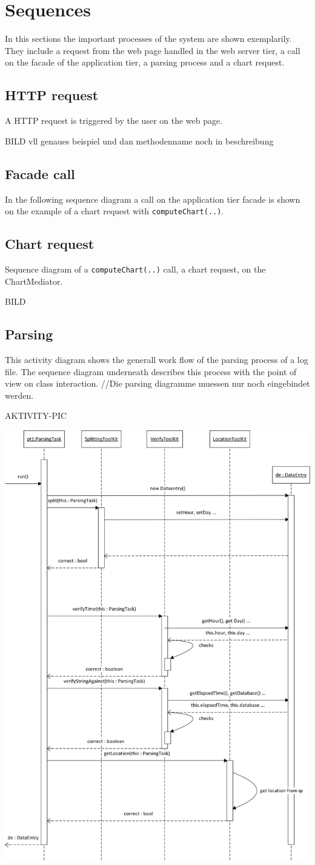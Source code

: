 \section{Sequences}
In this sections the important processes of the system are shown exemplarily. They include a request 
from the web page handled in the web server tier, a call on the facade of the application tier,
a parsing process and a chart request.

\subsection{HTTP request}
A HTTP request is triggered by the user on the web page.

BILD vll genaues beispiel und dan methodenname noch in beschreibung

\subsection{Facade call}
In the following sequence diagram a call on the application tier facade is shown 
on the example of a chart request with \texttt{computeChart(..)}.



\subsection{Chart request}
Sequence diagram of a \texttt{computeChart(..)} call, a chart request, on the ChartMediator.

BILD


\subsection{Parsing}
This activity diagram shows the generall work flow of the parsing process of a log file. 
The sequence diagram underneath describes this process with the point of view on class interaction.
//Die parsing diagramme muessen nur noch eingebindet werden.

AKTIVITY-PIC

\begin{center}
\includegraphics[width=0.7\linewidth]{Pictures/Seq/SeqParser.png}
\end{center}



   
